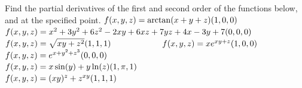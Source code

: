 \begin{Exercise} Find the partial derivatives of the first and second order of the functions below, and at the specified point. \label{part_afg_3_verand}
	\Question[difficulty=2] $f(x,y,z) = \arctan ( x + y + z ) \hfill  (1,0,0) \hspace{2cm}$
	\Question[difficulty=1] $f(x,y,z) = x^2 + 3 y^2 + 6 z^2 - 2 x y + 6 x z + 7 y z + 4 x - 3 y + 7\hfill  (0,0,0)\hspace{2cm}$
	\ifanalysis\Question[difficulty=1]\fi\ifcalculus\Question[difficulty=2]\fi $f(x,y,z) = \sqrt{xy+z^2} \hfill  (1,1,1)\hspace{2cm}$
	\ifanalysis\Question[difficulty=2]\fi\ifcalculus\Question[difficulty=3]\fi $f(x,y,z) = x e^{xy+z} \hfill  (1,0,0)\hspace{2cm}$
	\Question[difficulty=2] $f(x,y,z) = e^{x+y^2+z^3} \hfill  (0,0,0)\hspace{2cm}$
	\Question[difficulty=2] $f(x,y,z) = x\sin (y) + y\ln (z) \hfill  (1,\pi,1)\hspace{2cm}$
	\Question[difficulty=3] $f(x,y,z) = (xy)^z + z^{xy} \hfill  (1,1,1)\hspace{2cm}$
\end{Exercise}

